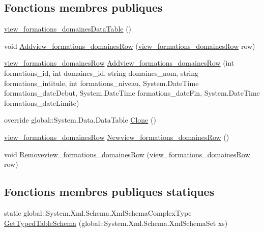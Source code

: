 \subsection*{Fonctions membres publiques}
\begin{DoxyCompactItemize}
\item 
\hyperlink{classforma_1_1formadb_data_set_1_1view__formations__domaines_data_table_af527ac5c2aadd5686ee12ae02a7e42a9}{view\+\_\+formations\+\_\+domaines\+Data\+Table} ()
\item 
void \hyperlink{classforma_1_1formadb_data_set_1_1view__formations__domaines_data_table_a47d08eca66f1a67388a4d1bfddbc75b6}{Addview\+\_\+formations\+\_\+domaines\+Row} (\hyperlink{classforma_1_1formadb_data_set_1_1view__formations__domaines_row}{view\+\_\+formations\+\_\+domaines\+Row} row)
\item 
\hyperlink{classforma_1_1formadb_data_set_1_1view__formations__domaines_row}{view\+\_\+formations\+\_\+domaines\+Row} \hyperlink{classforma_1_1formadb_data_set_1_1view__formations__domaines_data_table_a6f7a4475258b2a5a3eb38bdd0d4f303b}{Addview\+\_\+formations\+\_\+domaines\+Row} (int formations\+\_\+id, int domaines\+\_\+id, string domaines\+\_\+nom, string formations\+\_\+intitule, int formations\+\_\+niveau, System.\+Date\+Time formations\+\_\+date\+Debut, System.\+Date\+Time formations\+\_\+date\+Fin, System.\+Date\+Time formations\+\_\+date\+Limite)
\item 
override global\+::\+System.\+Data.\+Data\+Table \hyperlink{classforma_1_1formadb_data_set_1_1view__formations__domaines_data_table_a55ef67e8cb3163126709c1dd603fc6ea}{Clone} ()
\item 
\hyperlink{classforma_1_1formadb_data_set_1_1view__formations__domaines_row}{view\+\_\+formations\+\_\+domaines\+Row} \hyperlink{classforma_1_1formadb_data_set_1_1view__formations__domaines_data_table_ae6b2c83ba1cecf86cde9440b3f8a5bd3}{Newview\+\_\+formations\+\_\+domaines\+Row} ()
\item 
void \hyperlink{classforma_1_1formadb_data_set_1_1view__formations__domaines_data_table_acab3ec60e5f09497c1a961fc211921c0}{Removeview\+\_\+formations\+\_\+domaines\+Row} (\hyperlink{classforma_1_1formadb_data_set_1_1view__formations__domaines_row}{view\+\_\+formations\+\_\+domaines\+Row} row)
\end{DoxyCompactItemize}
\subsection*{Fonctions membres publiques statiques}
\begin{DoxyCompactItemize}
\item 
static global\+::\+System.\+Xml.\+Schema.\+Xml\+Schema\+Complex\+Type \hyperlink{classforma_1_1formadb_data_set_1_1view__formations__domaines_data_table_a47a57a4854f3faffecc654c58a85e8d1}{Get\+Typed\+Table\+Schema} (global\+::\+System.\+Xml.\+Schema.\+Xml\+Schema\+Set xs)
\end{DoxyCompactItemize}

